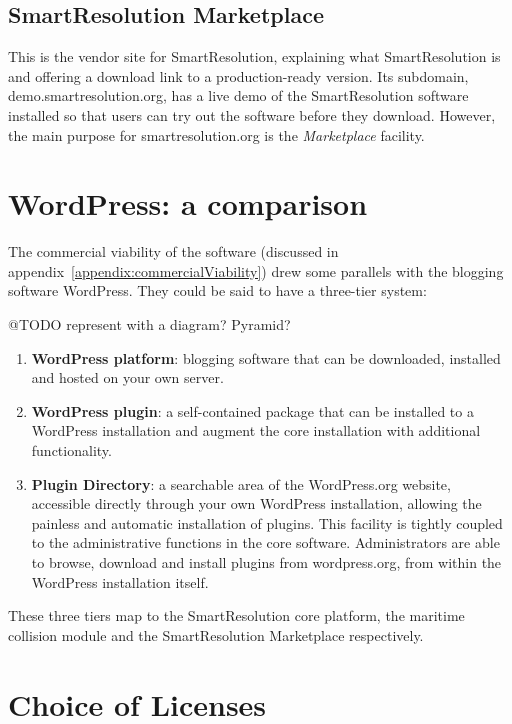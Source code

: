 \subsection{SmartResolution Marketplace}

This is the vendor site for SmartResolution, explaining what SmartResolution is and offering a download link to a production-ready version. Its subdomain, demo.smartresolution.org, has a live demo of the SmartResolution software installed so that users can try out the software before they download. However, the main purpose for smartresolution.org is the \emph{Marketplace} facility.

\section{WordPress: a comparison}

The commercial viability of the software (discussed in appendix~\ref{appendix:commercialViability}) drew some parallels with the blogging software WordPress. They could be said to have a three-tier system:

@TODO represent with a diagram? Pyramid?

\begin{enumerate}
    \item \textbf{WordPress platform}: blogging software that can be downloaded, installed and hosted on your own server.
    
    \item \textbf{WordPress plugin}: a self-contained package that can be installed to a WordPress installation and augment the core installation with additional functionality.
    
    \item \textbf{Plugin Directory}: a searchable area of the WordPress.org website, accessible directly through your own WordPress installation, allowing the painless and automatic installation of plugins. This facility is tightly coupled to the administrative functions in the core software. Administrators are able to browse, download and install plugins from wordpress.org, from within the WordPress installation itself. %
\end{enumerate}

These three tiers map to the SmartResolution core platform, the maritime collision module and the SmartResolution Marketplace respectively.

\section{Choice of Licenses}

